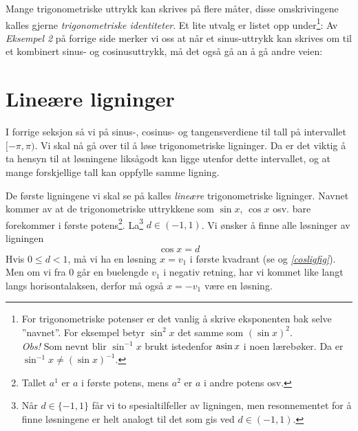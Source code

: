 Mange trigonometriske uttrykk kan skrives på flere måter, disse omskrivingene kalles gjerne \textit{trigonometriske identiteter}. Et lite utvalg er listet opp under\footnote{For trigonometriske potenser er det vanlig å skrive eksponenten bak selve ''navnet''. For eksempel betyr  $ \sin^2 x $ det samme som $ (\sin x)^2 $. \\ 
\textsl{Obs!} Som nevnt blir $ \sin^{-1}x $ brukt istedenfor $ \operatorname{asin} x $ i noen lærebøker. Da er $ \sin^{-1}x\neq(\sin x)^{-1} $.}:\regv
\trien
\triene
{}
\newpage
{}%
Av \textsl{Eksempel 2} på forrige side merker vi oss at når et sinus-uttrykk kan skrives om til et kombinert sinus- og cosinusuttrykk, må det også gå an å gå andre veien:\regv
\komb
\kombe

\section{Lineære ligninger \label{linlig}}
I forrige seksjon så vi på sinus-, cosinus- og tangensverdiene til tall på intervallet $ [-\pi, \pi) $. Vi skal nå gå over til å løse trigonometriske ligninger. Da er det viktig å ta hensyn til at løsningene liksågodt kan ligge utenfor dette intervallet, og at mange forskjellige tall kan oppfylle samme ligning. \vsk

De første ligningene vi skal se på kalles \textit{lineære} trigonometriske ligninger.  Navnet kommer av at de trigonometriske uttrykkene som $ \sin x $, $ \cos x $ osv. bare forekommer i første potens\footnote{Tallet $ a^1 $ er $ a $ i første potens, mens $ a^2 $ er $ a $ i andre potens osv.}.
La\footnote{Når $ {d\in\{-1, 1\}} $ får vi to spesialtilfeller av ligningen, men resonnementet for å finne løsningene er helt analogt til det som gis ved $ {d\in(-1, 1)} $.} $ {d\in(-1, 1)} $. Vi ønsker å finne alle løsninger av ligningen
\[ \cos x=d \label{cosslig} \]
Hvis $ {0\leq d <1}$, må vi ha en løsning $ {x=v_1} $ i første kvadrant (se  og \textsl{\ref{cosligfig}}). Men om vi fra 0 går en buelengde $ v_1 $ i negativ retning, har vi kommet like langt langs horisontalaksen, derfor må også $ {x=-v_1} $ være en løsning.\vsk

